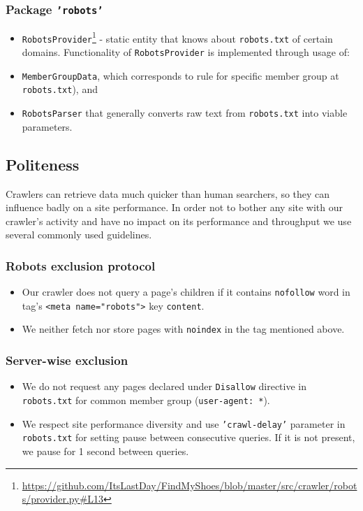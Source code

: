 \documentclass[format=sigconf]{acmart}
\begin{document}
    \subsubsection{Package \texttt{'robots'}}
    \begin{itemize}
    \item \texttt{RobotsProvider}\footnote{\url{https://github.com/ItsLastDay/FindMyShoes/blob/master/src/crawler/robots/provider.py\#L13}} - static entity that knows about \texttt{robots.txt} of certain domains. Functionality of \texttt{RobotsProvider} is implemented through usage of:
    \item \texttt{MemberGroupData}, which corresponds to rule for specific member group at \texttt{robots.txt}), and 
    \item \texttt{RobotsParser} that generally converts raw text from \texttt{robots.txt} into viable parameters.
    \end{itemize}

\subsection{Politeness}
Crawlers can retrieve data much quicker than human searchers, so they can influence badly on a site performance.
In order not to bother any site with our crawler's activity and have no impact on its performance and throughput we use several commonly used guidelines.

\subsubsection{Robots exclusion protocol}
\begin{itemize}
\item Our crawler does not query a page's children if it contains \texttt{nofollow} word in tag's \texttt{<meta name="robots">} key \texttt{content}.
\item We neither fetch nor store pages with \texttt{noindex} in the tag mentioned above.
\end{itemize}

\subsubsection{Server-wise exclusion}
\begin{itemize}
    \item We do not request any pages declared under  \texttt{Disallow} directive in \texttt{robots.txt} for common member group (\texttt{user-agent: *}).
    \item We respect site performance diversity and use \texttt{'crawl-delay'} parameter in \texttt{robots.txt} for setting pause between consecutive queries. If it is not present, we pause for 1 second between queries.
\end{itemize}
\end{document}
